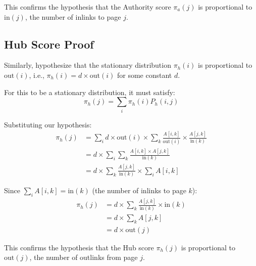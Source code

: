 \documentclass{article}
\begin{document}
This confirms the hypothesis that the Authority score $\pi_a(j)$ is proportional to $\text{in}(j)$, the number of inlinks to page $j$.

\subsection{Hub Score Proof}

Similarly, hypothesize that the stationary distribution $\pi_h(i)$ is proportional to $\text{out}(i)$, i.e., $\pi_h(i) = d \times \text{out}(i)$ for some constant $d$.

For this to be a stationary distribution, it must satisfy:
\begin{equation}
    \pi_h(j) = \sum_i \pi_h(i) P_h(i,j)
\end{equation}

Substituting our hypothesis:
\begin{align}
    \pi_h(j) &= \sum_i d \times \text{out}(i) \times \sum_k \frac{A[i,k]}{\text{out}(i)} \times \frac{A[j,k]}{\text{in}(k)}\\
    &= d \times \sum_i \sum_k \frac{A[i,k] \times A[j,k]}{\text{in}(k)}\\
    &= d \times \sum_k \frac{A[j,k]}{\text{in}(k)} \times \sum_i A[i,k]
\end{align}

Since $\sum_i A[i,k] = \text{in}(k)$ (the number of inlinks to page $k$):
\begin{align}
    \pi_h(j) &= d \times \sum_k \frac{A[j,k]}{\text{in}(k)} \times \text{in}(k)\\
    &= d \times \sum_k A[j,k]\\
    &= d \times \text{out}(j)
\end{align}

This confirms the hypothesis that the Hub score $\pi_h(j)$ is proportional to $\text{out}(j)$, the number of outlinks from page $j$.
\end{document}

